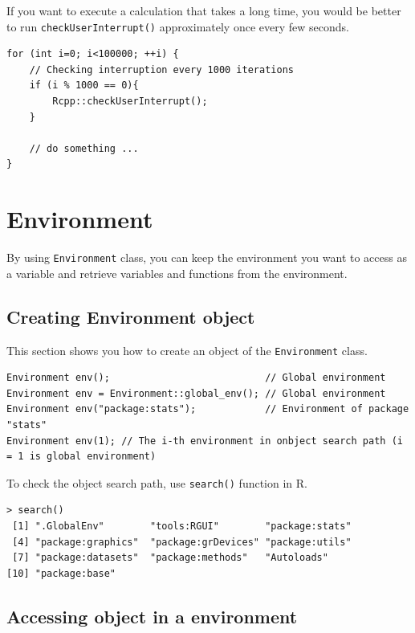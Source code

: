 \documentclass[
]{book}
\begin{document}
If you want to execute a calculation that takes a long time, you would be better to run \texttt{checkUserInterrupt()} approximately once every few seconds.

\begin{verbatim}
for (int i=0; i<100000; ++i) {
    // Checking interruption every 1000 iterations
    if (i % 1000 == 0){
        Rcpp::checkUserInterrupt();
    }

    // do something ...
}
\end{verbatim}

\hypertarget{environment}{%
\chapter{Environment}\label{environment}}

By using \texttt{Environment} class, you can keep the environment you want to access as a variable and retrieve variables and functions from the environment.

\hypertarget{creating-environment-object}{%
\section{Creating Environment object}\label{creating-environment-object}}

This section shows you how to create an object of the \texttt{Environment} class.

\begin{verbatim}
Environment env();                           // Global environment
Environment env = Environment::global_env(); // Global environment
Environment env("package:stats");            // Environment of package "stats"
Environment env(1); // The i-th environment in onbject search path (i = 1 is global environment)
\end{verbatim}

To check the object search path, use \texttt{search()} function in R.

\begin{verbatim}
> search()
 [1] ".GlobalEnv"        "tools:RGUI"        "package:stats"    
 [4] "package:graphics"  "package:grDevices" "package:utils"    
 [7] "package:datasets"  "package:methods"   "Autoloads"        
[10] "package:base"   
\end{verbatim}

\hypertarget{accessing-object-in-a-environment}{%
\section{Accessing object in a environment}\label{accessing-object-in-a-environment}}
\end{document}
